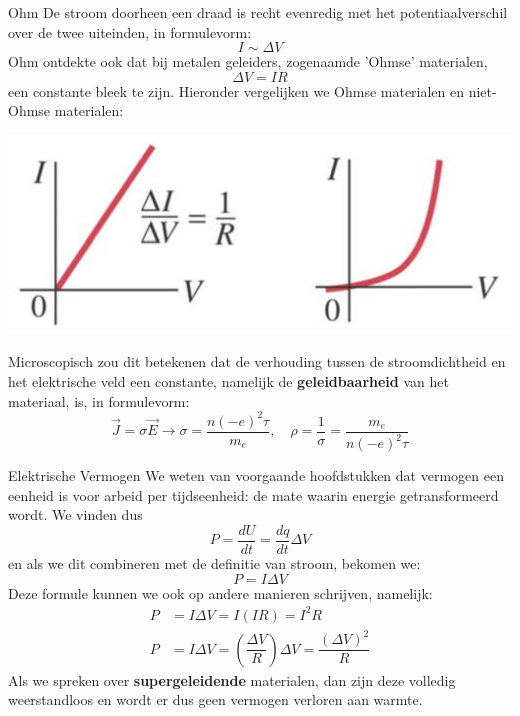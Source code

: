 \newpage

\begin{lem}[Ohm]{Ohm}
    De stroom doorheen een draad is recht evenredig met het potentiaalverschil over de twee uiteinden, in formulevorm:
    \begin{equation*}
         I \sim \Delta V
    \end{equation*}
    Ohm ontdekte ook dat bij metalen geleiders, zogenaamde 'Ohmse' materialen,
    \begin{equation*}
         \Delta V= IR 
    \end{equation*}
    een constante bleek te zijn. Hieronder vergelijken we Ohmse materialen en niet-Ohmse materialen:
    \begin{center}
        \includegraphics[scale = 0.2]{Images/Elektriciteit/GrafiekOhmseMaterialen.png}
    \end{center}
    Microscopisch zou dit betekenen dat de verhouding tussen de stroomdichtheid en het elektrische veld een constante, namelijk de \textbf{geleidbaarheid} van het materiaal, is, in formulevorm: 
    \begin{equation*}
        \Vec{J} = \sigma \Vec{E} \rightarrow \sigma = \dfrac{n(-e)^2\tau}{m_e}, \quad \rho = \dfrac{1}{\sigma} = \dfrac{m_e}{n(-e)^2\tau}
    \end{equation*}
\end{lem}

\begin{theo}{Elektrische Vermogen}
    We weten van voorgaande hoofdstukken dat vermogen een eenheid is voor arbeid per tijdseenheid: de mate waarin energie getransformeerd wordt. We vinden dus
    \begin{equation*}
        P = \dfrac{dU}{dt} = \dfrac{dq}{dt}\Delta V
    \end{equation*}
    en als we dit combineren met de definitie van stroom, bekomen we:
    \begin{equation*}
        P = I\Delta V
    \end{equation*}
    Deze formule kunnen we ook op andere manieren schrijven, namelijk:
    \begin{align*}
        P &=  I\Delta V= I(IR) = I^2R\\
        P &= I\Delta V = (\dfrac{\Delta V}{R})\Delta V = \dfrac{(\Delta V)^2}{R}
    \end{align*}
    Als we spreken over \textbf{supergeleidende} materialen, dan zijn deze volledig weerstandloos en wordt er dus geen vermogen verloren aan warmte.
\end{theo}

